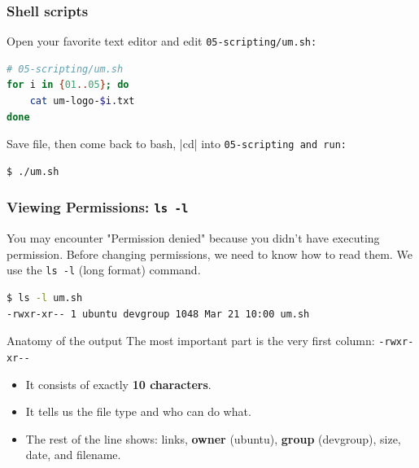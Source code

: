 \begin{frame}[fragile]
\frametitle{Shell scripts}
Open your favorite text editor and edit \tt{05-scripting/um.sh}:
\begin{lstlisting}[language=bash]
# 05-scripting/um.sh
for i in {01..05}; do
    cat um-logo-$i.txt
done
\end{lstlisting}
Save file, then come back to bash, \cverb|cd| into \tt{05-scripting} and run:
\begin{lstlisting}[language=bash]
$ ./um.sh
\end{lstlisting}
\end{frame}

\begin{frame}[fragile]
\frametitle{Viewing Permissions: \texttt{ls -l}}
You may encounter "Permission denied" because you didn't have executing permission. 
Before changing permissions, we need to know how to read them. 
We use the \texttt{ls -l} (long format) command.

\begin{lstlisting}[language=bash]
$ ls -l um.sh
-rwxr-xr-- 1 ubuntu devgroup 1048 Mar 21 10:00 um.sh
\end{lstlisting}

\begin{block}{Anatomy of the output}
The most important part is the very first column: \verb|-rwxr-xr--|
\begin{itemize}
    \item It consists of exactly \textbf{10 characters}.
    \item It tells us the file type and who can do what.
    \item The rest of the line shows: links, \textbf{owner} (ubuntu), \textbf{group} (devgroup), size, date, and filename.
\end{itemize}
\end{block}
\end{frame}

